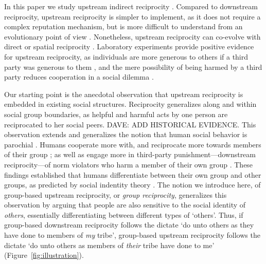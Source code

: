 \documentclass[12pt,a4paper]{article}
\begin{document}
In this paper we study upstream indirect reciprocity \citep*{nowak2005evolution,nowak2007upstream,boyd1989evolution}. Compared to downstream reciprocity, upstream reciprocity is simpler to implement, as it does not require a complex reputation mechanism, but is more difficult to understand from an evolutionary point of view \citep*{nowak2005evolution,boyd1989evolution}. Nonetheless, upstream reciprocity can co-evolve with direct or spatial reciprocity \citep*{nowak2007upstream}. Laboratory experiments provide positive evidence for upstream reciprocity, as individuals are more generous to others if a third party was generous to them \citep*{dufwenberg2001direct,guth2001trust,greiner2005indirect}, and the mere possibility of being harmed by a third party reduces cooperation in a social dilemma \citep*{weisel2016social}.

Our starting point is the anecdotal observation that upstream reciprocity is embedded in existing social structures. Reciprocity generalizes along and within social group boundaries, as helpful and harmful acts by one person are reciprocated to her social peers. DAVE: ADD HISTORICAL EVIDENCE.
This observation extends and generalizes the notion that human social behavior is parochial \citep*{balliet2014ingroup,DeDreu2014}. Humans cooperate more with, and reciprocate more towards members of their group \citep*{chen2009group,chen2011potential}; as well as engage more in third-party punishment---downstream reciprocity---of norm violators who harm a member of their own group \citep*{bernhard2006group,bernhard2006parochial}. These findings established that humans differentiate between their own group and other groups, as predicted by social indentity theory \citep*{tajfel1979integrative}.
The notion we introduce here, of group-based upstream reciprocity, or \emph{group reciprocity}, generalizes this observation by arguing that people are also sensitive to the social identity of \emph{others}, essentially differentiating between different types of `others'. Thus, if group-based downstream reciprocity \citep*{bernhard2006group,bernhard2006parochial} follows the dictate `do unto others as they have done to members of \emph{my} tribe', group-based upstream reciprocity follows the dictate `do unto others as members of \emph{their} tribe have done to me' (Figure~\ref{fig:illustration}).
\end{document}
